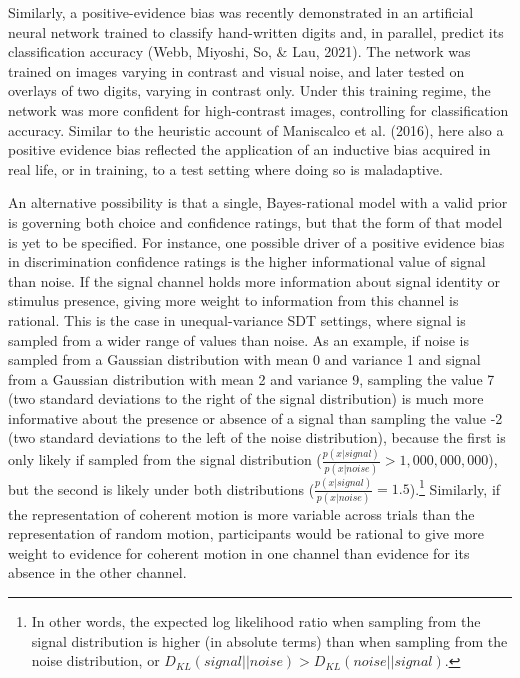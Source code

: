 \documentclass[12pt,twoside]{reedthesis}
\begin{document}
Similarly, a positive-evidence bias was recently demonstrated in an artificial neural network trained to classify hand-written digits and, in parallel, predict its classification accuracy (Webb, Miyoshi, So, \& Lau, 2021). The network was trained on images varying in contrast and visual noise, and later tested on overlays of two digits, varying in contrast only. Under this training regime, the network was more confident for high-contrast images, controlling for classification accuracy. Similar to the heuristic account of Maniscalco et al. (2016), here also a positive evidence bias reflected the application of an inductive bias acquired in real life, or in training, to a test setting where doing so is maladaptive.

An alternative possibility is that a single, Bayes-rational model with a valid prior is governing both choice and confidence ratings, but that the form of that model is yet to be specified. For instance, one possible driver of a positive evidence bias in discrimination confidence ratings is the higher informational value of signal than noise. If the signal channel holds more information about signal identity or stimulus presence, giving more weight to information from this channel is rational. This is the case in unequal-variance SDT settings, where signal is sampled from a wider range of values than noise. As an example, if noise is sampled from a Gaussian distribution with mean 0 and variance 1 and signal from a Gaussian distribution with mean 2 and variance 9, sampling the value 7 (two standard deviations to the right of the signal distribution) is much more informative about the presence or absence of a signal than sampling the value -2 (two standard deviations to the left of the noise distribution), because the first is only likely if sampled from the signal distribution (\(\frac{p(x|signal)}{p(x|noise)}>1,000,000,000\)), but the second is likely under both distributions (\(\frac{p(x|signal)}{p(x|noise)}=1.5\)).\footnote{In other words, the expected log likelihood ratio when sampling from the signal distribution is higher (in absolute terms) than when sampling from the noise distribution, or \(D_{KL}(signal||noise)>D_{KL}(noise||signal)\).} Similarly, if the representation of coherent motion is more variable across trials than the representation of random motion, participants would be rational to give more weight to evidence for coherent motion in one channel than evidence for its absence in the other channel.
\end{document}
